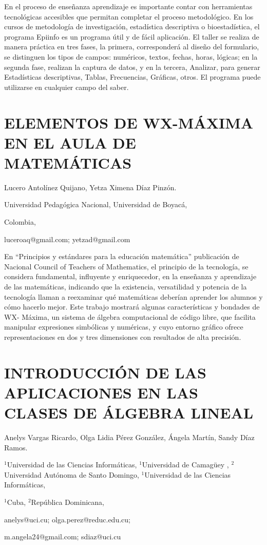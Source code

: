 En el proceso de enseñanza aprendizaje es importante contar con herramientas
tecnológicas accesibles que permitan completar el proceso metodológico.
En los cursos de metodología de investigación, estadística descriptiva
o bioestadística, el programa Epiinfo es un programa útil y de fácil
aplicación. El taller se realiza de manera práctica en tres fases,
la primera, corresponderá al diseño del formulario, se distinguen
los tipos de campos: numéricos, textos, fechas, horas, lógicas; en
la segunda fase, realizan la captura de datos, y en la tercera, Analizar,
para generar Estadísticas descriptivas, Tablas, Frecuencias, Gráficas,
otros. El programa puede utilizarse en cualquier campo del saber.


\section{ELEMENTOS DE WX-MÁXIMA EN EL AULA DE MATEMÁTICAS }

\begin{datos}

Lucero Antolínez Quijano, Yetza Ximena Díaz Pinzón.

Universidad Pedagógica Nacional, Universidad de Boyacá,

Colombia,

luceroaq@gmail.com; yetzad@gmail.com

\end{datos}

En “Principios y estándares para la educación matemática” publicación
de Nacional Council of Teachers of Mathematics, el principio de la
tec­nología, se considera fundamental, influyente y enriquecedor,
en la enseñanza y aprendizaje de las matemáticas, indicando que la
existencia, versatilidad y potencia de la tecnolo­gía llaman a reexaminar
qué matemáticas deberían aprender los alumnos y cómo hacerlo mejor.
Este trabajo mostrará algunas características y bondades de WX- Máxima,
un sistema de álgebra computacional de código libre, que facilita
manipular expresiones simbólicas y numéricas, y cuyo entorno gráfico
ofrece representaciones en dos y tres dimensiones con resultados de
alta precisión. 


\section{INTRODUCCIÓN DE LAS APLICACIONES EN LAS CLASES DE ÁLGEBRA LINEAL}

\begin{datos}

Anelys Vargas Ricardo, Olga Lidia Pérez González, Ángela Martín, Sandy
Díaz Ramos.

$^{1}$Universidad de las Ciencias Informáticas, $^{1}$Universidad
de Camagüey , $^{2}$Universidad Autónoma de Santo Domingo, $^{1}$Universidad
de las Ciencias Informáticas,

$^{1}$Cuba, $^{2}$República Dominicana, 

anelys@uci.cu; olga.perez@reduc.edu.cu;

m.angela24@gmail.com; sdiaz@uci.cu 

\end{datos}

